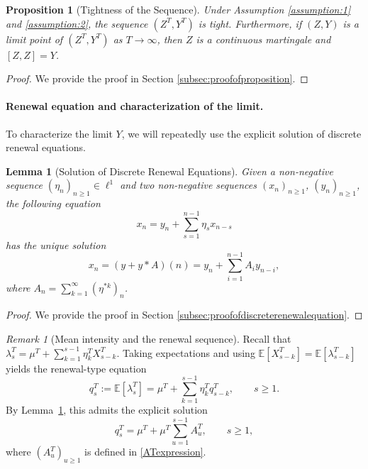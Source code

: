 \documentclass[letterpaper]{article}
\numberwithin{equation}{section}
\newtheorem{lemma}[theorem]{Lemma}
\newtheorem{proposition}[theorem]{Proposition}
\theoremstyle{definition}
\theoremstyle{remark}
\newtheorem{remark}[theorem]{Remark}
\begin{document}
\begin{proposition}[Tightness of the Sequence]\label{proposition:1}
  Under Assumption \ref{assumption:1} and \ref{assumption:2}, the sequence $(Z^T,Y^T)$ is tight. Furthermore, if $(Z,Y)$ is a limit point of $(Z^T,Y^T)$ as $T\rightarrow\infty$, then $Z$ is a continuous martingale and $[Z,Z]=Y$.
\end{proposition}
\begin{proof}
  We provide the proof in Section \ref{subsec:proofofproposition}.
\end{proof}

\paragraph{Renewal equation and characterization of the limit.}To characterize the limit $Y$, we will repeatedly use the explicit solution of discrete renewal equations.

\begin{lemma}[Solution of Discrete Renewal Equations]\label{lemma:discreterenewalequation}
  Given a non-negative sequence $(\eta_n)_{n\ge1} \in \ell^1$ and two non-negative sequences $(x_n)_{n\ge1}$, $(y_n)_{n\ge1}$, the following equation
  \begin{equation}\label{seriesconvolution}
    x_n = y_n + \sum_{s=1}^{n-1} \eta_s x_{n-s}
  \end{equation}
  has the unique solution
  \[
    x_n = \left(y + y * A\right)(n) = y_n + \sum_{i=1}^{n-1} A_i y_{n-i},
  \]
  {where $A_n=\sum_{k=1}^\infty (\eta^{*k})_n$.}
\end{lemma}

\begin{proof}
    We provide the proof in Section \ref{subsec:proofofdiscreterenewalequation}.
\end{proof}

{\begin{remark}[Mean intensity and the renewal sequence]\label{rem:mean_lambda}
Recall that $\lambda_s^T=\mu^T+\sum_{k=1}^{s-1}\eta_k^T X_{s-k}^T$. Taking expectations and using $\mathbb E[X_{s-k}^T]=\mathbb E[\lambda_{s-k}^T]$ yields the renewal-type equation
\[
q_s^T:=\mathbb E[\lambda_s^T]
=\mu^T+\sum_{k=1}^{s-1}\eta_k^T q_{s-k}^T,\qquad s\ge1.
\]
By Lemma~\ref{lemma:discreterenewalequation}, this admits the explicit solution
\[
q_s^T=\mu^T+\mu^T\sum_{u=1}^{s-1}A_u^T,\qquad s\ge1,
\]
where $(A_u^T)_{u\ge1}$ is defined in \eqref{ATexpression}.
\end{remark}}
\end{document}
